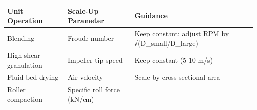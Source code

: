 \documentclass[
  11pt,
  a4paper,
]{report}
\begin{document}
\begin{longtable}[]{@{}lll@{}}
\toprule
\begin{minipage}[b]{0.32\columnwidth}\raggedright
Unit Operation\strut
\end{minipage} & \begin{minipage}[b]{0.39\columnwidth}\raggedright
Scale-Up Parameter\strut
\end{minipage} & \begin{minipage}[b]{0.20\columnwidth}\raggedright
Guidance\strut
\end{minipage}\tabularnewline
\midrule
\endhead
\begin{minipage}[t]{0.32\columnwidth}\raggedright
Blending\strut
\end{minipage} & \begin{minipage}[t]{0.39\columnwidth}\raggedright
Froude number\strut
\end{minipage} & \begin{minipage}[t]{0.20\columnwidth}\raggedright
Keep constant; adjust RPM by √(D\_small/D\_large)\strut
\end{minipage}\tabularnewline
\begin{minipage}[t]{0.32\columnwidth}\raggedright
High-shear granulation\strut
\end{minipage} & \begin{minipage}[t]{0.39\columnwidth}\raggedright
Impeller tip speed\strut
\end{minipage} & \begin{minipage}[t]{0.20\columnwidth}\raggedright
Keep constant (5-10 m/s)\strut
\end{minipage}\tabularnewline
\begin{minipage}[t]{0.32\columnwidth}\raggedright
Fluid bed drying\strut
\end{minipage} & \begin{minipage}[t]{0.39\columnwidth}\raggedright
Air velocity\strut
\end{minipage} & \begin{minipage}[t]{0.20\columnwidth}\raggedright
Scale by cross-sectional area\strut
\end{minipage}\tabularnewline
\begin{minipage}[t]{0.32\columnwidth}\raggedright
Roller compaction\strut
\end{minipage} & \begin{minipage}[t]{0.39\columnwidth}\raggedright
Specific roll force (kN/cm)\strut
\end{minipage} & \begin{minipage}[t]{0.20\columnwidth}\raggedright

\end{minipage}
\end{longtable}
\end{document}
